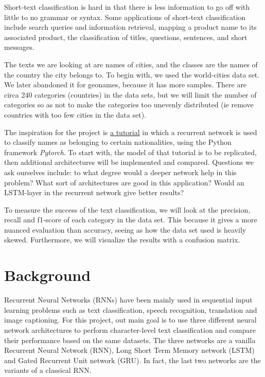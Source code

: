\documentclass[runningheads]{llncs}
\begin{document}
Short-text classification is hard in that there is less information to go off with little to no grammar or syntax. Some applications of short-text classification include search queries and information retrieval, mapping a product name to its associated product, the classification of titles, questions, sentences, and short messages.

The texts we are looking at are names of cities, and the classes are the names of the country the city belongs to. To begin with, we used the world-cities data set. We later abandoned it for geonames, because it has more samples. There are circa 240 categories (countries) in the data sets, but we will limit the number of categories so as not to make the categories too unevenly distributed (ie remove countries with too few cities in the data set).

The inspiration for the project is \href{https://github.com/spro/practical-pytorch/blob/master/char-rnn-classification/char-rnn-classification.ipynb}{a tutorial}
 in which a recurrent network is used to classify names as belonging to certain nationalities, using the Python framework \textit{Pytorch}. To start with, the model of that tutorial is to be replicated, then additional architectures will be implemented and compared. Questions we ask ourselves include: to what degree would a deeper network help in this problem? What sort of architectures are good in this application? Would an LSTM-layer in the recurrent network give better results? 

To measure the success of the text classification, we will look at the precision, recall and f1-score of each category in the data set. This because it gives a more nuanced evaluation than accuracy, seeing as how the data set used is heavily skewed. Furthermore, we will visualize the results with a confusion matrix.


\section{Background}


Recurrent Neural Networks (RNNs) have been mainly used in sequential input learning problems such as text classification, speech recognition, translation and image captioning. For this project, out main goal is to use three different neural network architectures to perform character-level text classification and compare their performance based on the same datasets. The three networks are a vanilla Recurrent Neural Network (RNN), Long Short Term Memory network (LSTM) and Gated Recurrent Unit network (GRU). In fact, the last two networks are the variants of a classical RNN. 
\end{document}
